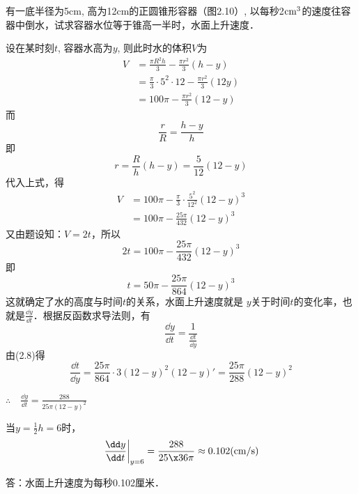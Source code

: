 \begin{example}
有一底半径为5cm, 高为12cm的正圆锥形容器（图2.10）, 以每秒2$\rm cm^3$的速度往容器中倒水，试求容器水位等于锥高一半时，水面上升速度．
\end{example}


\begin{solution}
    设在某时刻$t$, 容器水高为$y$, 则此时水的体积$V$为
 \begin{align*}
     V&=\frac{\pi R^2h}{3}-\frac{\pi r^2}{3}(h-y)\\
     &=\frac{\pi}{3}\cdot 5^2\cdot 12-\frac{\pi r^2}{3}(12y)\\
     &=100\pi-\frac{\pi r^2}{3}(12-y)
 \end{align*}
而
\[\frac{r}{R}=\frac{h-y}{h}\]
即
\[r=\frac{R}{h}(h-y)=\frac{5}{12}(12-y)\]
代入上式，得
\begin{align*}
    V&=100\pi-\frac{\pi}{3}\cdot \frac{5^2}{12^2}(12-y)^3\\
    &=100\pi-\frac{25\pi}{432}(12-y)^3
\end{align*}
又由题设知：$V=2t$，所以
\[2t=100\pi-\frac{25\pi}{432}(12-y)^3\]
即
\begin{equation}
    t=50\pi-\frac{25\pi}{864}(12-y)^3
\end{equation}
这就确定了水的高度与时间$t$的关系，水面上升速度就是
$y$关于时间$t$的变化率，也就是$\frac{\dd y}{\dd t}$．根据反函数求导法则，有
\[\frac{\dd y}{\dd t}=\frac{1}{\frac{\dd t}{\dd y}}\]
由(2.8)得
\[\frac{\dd t}{\dd y}=\frac{25\pi}{864}\cdot 3(12-y)^2(12-y)'=\frac{25\pi}{288}(12-y)^2\]

$\therefore\quad \frac{\dd y}{\dd t}=\frac{288}{25\pi(12-y)^2}$

当$y=\frac{1}{2}h=6$时，
\[\left.\frac{\dd y}{\dd t}\right|_{y=6}=\frac{288}{25\x 36\pi}\approx 0.102({\rm cm/s})\]

答：水面上升速度为每秒0.102厘米．
\end{solution}

